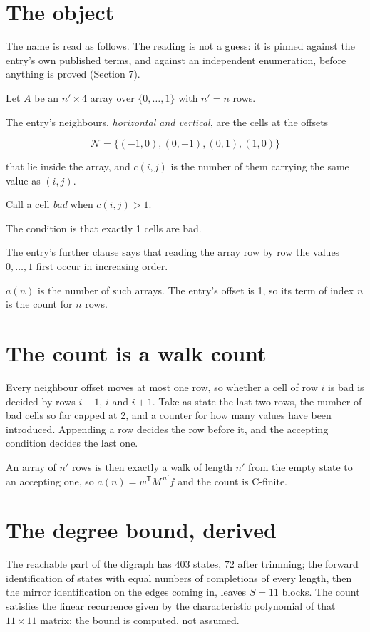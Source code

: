 \documentclass[11pt]{article}
\theoremstyle{definition}
\begin{document}
\section{The object}

The name is read as follows. The reading is not a guess: it is pinned against the entry's own published terms, and against an independent enumeration, before anything is proved (Section 7).

Let $A$ be an $n' \times 4$ array over $\{0,\dots,1\}$ with $n' = n$ rows.

The entry's neighbours, {\itshape horizontal and vertical}, are the cells at the offsets

\[\mathcal{N} = \{(-1,0), (0,-1), (0,1), (1,0)\}\]

that lie inside the array, and $c(i,j)$ is the number of them carrying the same value as $(i,j)$.

Call a cell {\itshape bad} when $c(i,j) > 1$.

The condition is that exactly 1 cells are bad.

The entry's further clause says that reading the array row by row the values $0,\dots,1$ first occur in increasing order.

$a(n)$ is the number of such arrays. The entry's offset is 1, so its term of index $n$ is the count for $n$ rows.

\section{The count is a walk count}

Every neighbour offset moves at most one row, so whether a cell of row $i$ is bad is decided by rows $i-1$, $i$ and $i+1$. Take as state the last two rows, the number of bad cells so far capped at 2, and a counter for how many values have been introduced. Appending a row decides the row before it, and the accepting condition decides the last one.

An array of $n'$ rows is then exactly a walk of length $n'$ from the empty state to an accepting one, so $a(n) = w^{\mathsf T}M^{\,n'}f$ and the count is C-finite.

\section{The degree bound, derived}

The reachable part of the digraph has $403$ states, $72$ after trimming; the forward identification of states with equal numbers of completions of every length, then the mirror identification on the edges coming in, leaves $S = 11$ blocks. The count satisfies the linear recurrence given by the characteristic polynomial of that $11\times11$ matrix; the bound is computed, not assumed.
\end{document}
